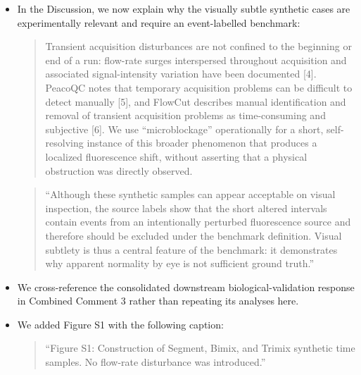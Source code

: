 \documentclass[
  11pt,
  a4paper,
]{article}
\begin{document}
\begin{itemize}
  \begin{quote}
  ``To test the effect of flow-rate disturbances aligned with or
  independent of source-linked fluorescence changes, we altered only the
  Time channel while leaving fluorescence, scatter, source labels, and
  event order unchanged (Fig. S4). FlowMOP and PeacoQC were unchanged
  under both source-linked and random Time warping. In contrast,
  FlowCut\textquotesingle s sensitivity and specificity shifted after
  Time-only perturbation.''
  \end{quote}
\item
  In the Discussion, we now explain why the visually subtle synthetic
  cases are experimentally relevant and require an event-labelled
  benchmark:

  \begin{quote}
  Transient acquisition disturbances are not confined to the beginning
  or end of a run: flow-rate surges interspersed throughout acquisition
  and associated signal-intensity variation have been documented
  {[}4{]}. PeacoQC notes that temporary acquisition problems can be
  difficult to detect manually {[}5{]}, and FlowCut describes manual
  identification and removal of transient acquisition problems as
  time-consuming and subjective {[}6{]}. We use ``microblockage''
  operationally for a short, self-resolving instance of this broader
  phenomenon that produces a localized fluorescence shift, without
  asserting that a physical obstruction was directly observed.
  \end{quote}

  \begin{quote}
  ``Although these synthetic samples can appear acceptable on visual
  inspection, the source labels show that the short altered intervals
  contain events from an intentionally perturbed fluorescence source and
  therefore should be excluded under the benchmark definition. Visual
  subtlety is thus a central feature of the benchmark: it demonstrates
  why apparent normality by eye is not sufficient ground truth.''
  \end{quote}
\item
  We cross-reference the consolidated downstream biological-validation
  response in Combined Comment 3 rather than repeating its analyses
  here.
\item
  We added Figure S1 with the following caption:

  \begin{quote}
  ``Figure S1: Construction of Segment, Bimix, and Trimix synthetic time
  samples. No flow-rate disturbance was introduced.''
  \end{quote}
\end{itemize}
\end{document}
